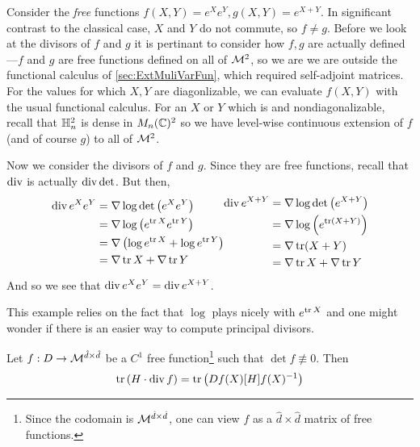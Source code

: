 \begin{example}
  Consider the \emph{free} functions \(f(X,Y)=e^Xe^Y, g(X,Y)=e^{X+Y}\). In
  significant contrast to the classical case, \(X\) and \(Y\) do not commute,
  so \(f\neq g\). Before we look at the divisors of \(f\) and \(g\) it is
  pertinant to consider how \(f,g\) are actually defined---\(f\) and \(g\) are
  free functions defined on all of \(\mathcal{M}^2\), so we are we are outside the functional
  calculus of \cref{sec:ExtMuliVarFun}, which required self-adjoint matrices.
  For the values for which \(X, Y\) are diagonlizable, we can evaluate \(f(X,Y)\)
  with the usual functional calculus. For an \(X\) or \(Y\) which is
  and nondiagonalizable, recall that \(\mathbb{H}_n^2\) is dense in \(M_n(\mathbb{C})^2\) so
  we have level-wise continuous extension of \(f\) (and of course \(g\)) to all
  of \(\mathcal{M}^2\).

  Now we consider the divisors of \(f\) and \(g\). Since they are free
  functions, recall that \(\operatorname{div}\) is actually \(\operatorname{div} \det\). But then,
  \begin{equation*}
  \begin{split}
    \operatorname{div} e^Xe^Y &= \nabla \log \det \left( e^Xe^Y \right) \\
    &= \nabla \log \left( e^{\operatorname{tr} X} e^{\operatorname{tr} Y} \right) \\
    &= \nabla \left( \log e^{\operatorname{tr} X} + \log e^{\operatorname{tr} Y} \right) \\
    &= \nabla \operatorname{tr} X + \nabla\operatorname{tr} Y
  \end{split}
  \begin{split}
    \operatorname{div} e^{X+Y} &= \nabla \log \det \left( e^{X+Y} \right) \\
    &= \nabla \log \left( e^{\operatorname{tr} (X+Y)}  \right) \\
    &= \nabla \operatorname{tr} (X+Y) \\
    &= \nabla \operatorname{tr} X + \nabla\operatorname{tr} Y
  \end{split}
  \end{equation*}
  And so we see that \(\operatorname{div} e^Xe^Y = \operatorname{div} e^{X+Y}\).
\end{example}

This example relies on the fact that \(\log \) plays nicely with \(e^{\operatorname{tr} X}\)
and one might wonder if there is an easier way to compute principal divisors.

\begin{theorem}
  Let \(f: D \to \mathcal{M}^{\hat{d} \times \hat{d}}\) be a \(C^1\) free
  function\footnote{Since the codomain is \(\mathcal{M}^{\hat{d}\times \hat{d}}\), one
    can view \(f\) as a \(\hat{d} \times \hat{d}\) matrix of free functions.}
  such that \(\det f \not\equiv 0\). Then
  \[
    \operatorname{tr} \left( H \cdot \operatorname{div} f \right) = \operatorname{tr} \left(Df(X)[H] f(X)^{-1}\right)
  \]
\end{theorem}

